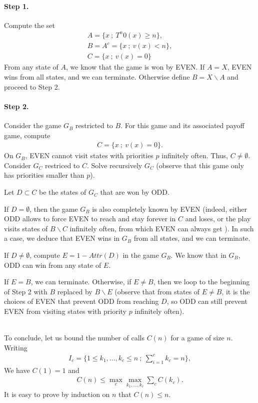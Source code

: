 \documentclass{article}
\begin{document}
\paragraph{Step 1.}
Compute the set
\begin{align}
  A = \{ x ~;~ T^n 0(x) \ge n \}, \\
  B = A^c = \{ x ~;~ v(x) < n \}, \\
  C = \{ x ~;~ v(x) = 0 \}
\end{align}
From any state of $A$, we know that the game is won by EVEN. If $A=X$, EVEN wins from all states, and we can terminate. Otherwise define $B=X \backslash A$ and proceed to Step 2.

\paragraph{Step 2.}
Consider the game $G_B$ restricted to $B$. For this game and its associated payoff game, compute
\begin{align}
C = \{ x ~;~ v(x) = 0 \}.
\end{align}
On $G_B$, EVEN cannot visit states with priorities $p$ infinitely often. Thus, $C \neq \emptyset$. Consider $G_C$ restriced to $C$. Solve recursively $G_C$ (observe that this game only has priorities smaller than $p$).

Let $D \subset C$ be the states of $G_C$ that are won by ODD.

If $D = \emptyset$, then the game $G_B$ is also completely known by EVEN (indeed, either ODD allows to force EVEN to reach and stay forever in $C$ and loses, or the play visits states of $B \backslash C$ infinitely often, from which EVEN can always get ). In such a case, we deduce that EVEN wins in $G_B$ from all states, and we can terminate. 

If $D \neq \emptyset$, compute $E=1-Attr(D)$ in the game $G_B$. We know that in $G_B$, ODD can win from any state of $E$.

If $E=B$, we can terminate. Otherwise, if $E \neq B$, then we loop to the beginning of Step 2 with $B$ replaced by $B \backslash E$ (observe that from states of $E \neq B$, it is the choices of EVEN that prevent ODD from reaching $D$, so ODD can still prevent EVEN from visiting states with priority $p$ infinitely often). 

~\\

To conclude, let us bound the number of calls $C(n)$ for a game of size $n$. Writing
\begin{align}
  I_c = \{ 1 \le k_1, \dots, k_c \le n ~;~ \sum_{i=1}^c k_c=n \},
\end{align}
We have $C(1)=1$ and
\begin{align}
  C(n) \le \max_c \max_{k_1,\dots,k_c} \sum_c C(k_c).
\end{align}
It is easy to prove by induction on $n$ that $C(n)\le n$.





 
\end{document}
